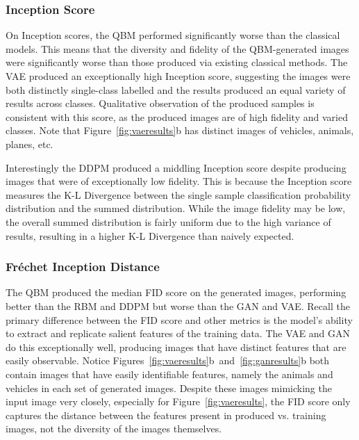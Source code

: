\documentclass[technologies,article,accept,pdftex,moreauthors]{Definitions/mdpi}
\begin{document}
\subsubsection{Inception Score}
On Inception scores, the QBM performed significantly worse than the classical models. This means that the diversity and fidelity of the QBM-generated images were significantly worse than those produced via existing classical methods. The VAE produced an exceptionally high Inception score, suggesting the images were both distinctly single-class labelled and the results produced an equal variety of results across classes. Qualitative observation of the produced samples is consistent with this score, as the produced images are of high fidelity and varied classes. Note that Figure~\ref{fig:vaeresults}b has distinct images of vehicles, animals, planes, etc.


Interestingly the DDPM produced a middling Inception score despite producing images that were of exceptionally low fidelity. This is because the Inception score measures the K-L Divergence between the single sample classification probability distribution and the summed distribution. While the image fidelity may be low, the overall summed distribution is fairly uniform due to the high variance of results, resulting in a higher K-L Divergence than naively expected.

\subsubsection{Fréchet Inception Distance}
The QBM produced the median FID score on the generated images, performing better than the RBM and DDPM but worse than the GAN and VAE. Recall the primary difference between the FID score and other metrics is the model's ability to extract and replicate salient features of the training data. The VAE and GAN do this exceptionally well, producing images that have distinct features that are easily observable. Notice \mbox{Figures~\ref{fig:vaeresults}b and \ref{fig:ganresults}b} both contain images that have easily identifiable features, namely the animals and vehicles in each set of generated images. Despite these images mimicking the input image very closely, especially for Figure~\ref{fig:vaeresults}, the FID score only captures the distance between the features present in produced vs. training images, not the diversity of the images themselves.
\end{document}
